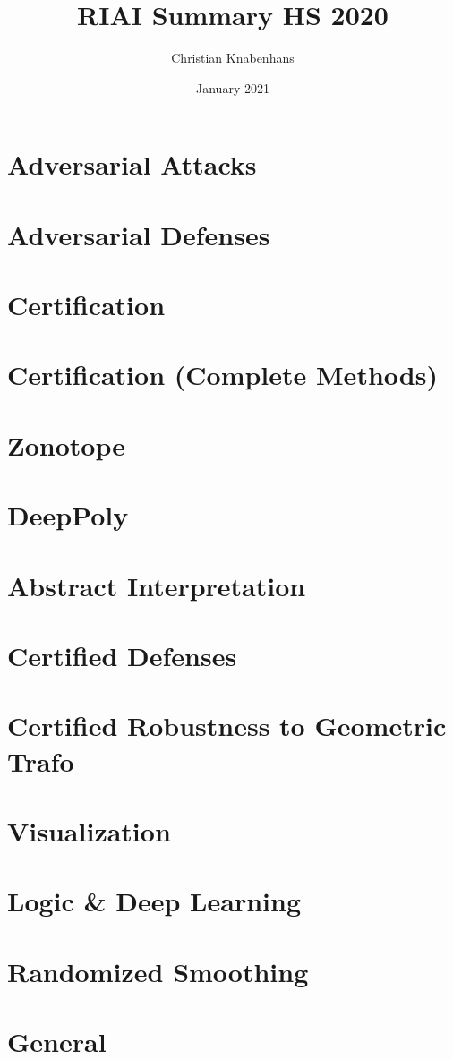 \documentclass[11pt]{article}
\title{RIAI Summary HS 2020}
\author{Christian Knabenhans}
\date{January 2021}
\begin{document}
\pagestyle{empty}
\begin{multicols*}{3}
\section*{Adversarial Attacks}

\section*{Adversarial Defenses}

\section*{Certification}

\section*{Certification (Complete Methods)}

\section*{Zonotope}

\section*{DeepPoly}

\section*{Abstract Interpretation}

\section*{Certified Defenses }

\section*{Certified Robustness to Geometric Trafo}

\section*{Visualization}

\section*{Logic \& Deep Learning}

\section*{Randomized Smoothing}

\section*{General}

\end{multicols*}
\end{document}
